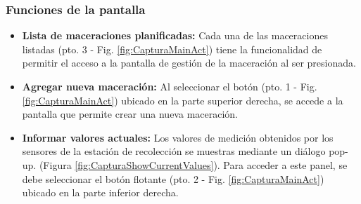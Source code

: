            \subsubsection{Funciones de la pantalla}
                \begin{itemize}
                    \item \textbf{Lista de maceraciones planificadas:} Cada una de las maceraciones listadas (pto. 3 - Fig. \ref{fig:CapturaMainAct}) tiene la funcionalidad de permitir el acceso a la pantalla de gestión de la maceración al ser presionada.
                    
                    \item \textbf{Agregar nueva maceración:} Al seleccionar el botón (pto. 1 - Fig. \ref{fig:CapturaMainAct}) ubicado en la parte superior derecha, se accede a la pantalla que permite crear una nueva maceración.
                    
                    \item \textbf{Informar valores actuales:} Los valores de medición obtenidos por los sensores de la estación de recolección se muestras mediante un diálogo pop-up. (Figura \ref{fig:CapturaShowCurrentValues}). Para acceder a este panel, se debe seleccionar el botón flotante (pto. 2 - Fig. \ref{fig:CapturaMainAct}) ubicado en la parte inferior derecha.
            \end{itemize}

